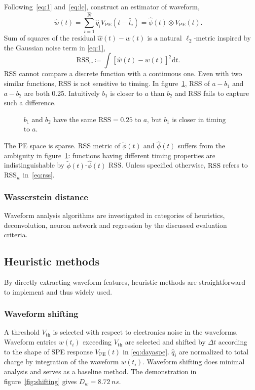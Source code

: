 Following~\eqref{eq:1} and~\eqref{eq:lc}, construct an estimator of waveform,
\begin{equation}
  \label{eq:w-hat}
  \hat{w}(t) = \sum_{i=1}^{\hat{N}}\hat{q}_i V_\mathrm{PE}(t-\hat{t}_i) = \hat{\phi}(t) \otimes V_\mathrm{PE}(t).
\end{equation}
Sum of squares of the residual $\hat{w}(t) - w(t)$ is a natural $\ell_2$-metric inspired by the Gaussian noise term in \eqref{eq:1},
\begin{equation}
  \label{eq:rss}
  \mathrm{RSS}_w\coloneqq\int\left[\hat{w}(t) - w(t)\right]^2\mathrm{d}t.
\end{equation}
RSS cannot compare a discrete function with a continuous one.  Even with two similar functions, RSS is not sensitive to timing.  In figure~\ref{fig:l2}, RSS of  $a-b_{1}$ and $a-b_{2}$ are both 0.25.  Intuitively $b_1$ is closer to $a$ than $b_2$ and RSS fails to capture such a difference.
\begin{figure}[H]
  \centering
  \scalebox{0.4}{}
  \caption{\label{fig:l2} $b_1$ and $b_2$ have the same $\mathrm{RSS}=0.25$ to $a$, but $b_1$ is closer in timing to $a$.}
\end{figure}

The PE space is sparse. RSS metric of $\tilde{\phi}(t)$ and $\hat{\phi}(t)$ suffers from the ambiguity in figure~\ref{fig:l2}: functions having different timing properties are indistinguishable by $\tilde{\phi}(t)$-$\hat{\phi}(t)$ RSS.  Unless specified otherwise, $\mathrm{RSS}$ refers to $\mathrm{RSS}_w$ in~\eqref{eq:rss}.

\subsubsection{Wasserstein distance}
\label{sec:W-dist}



Waveform analysis algorithms are investigated in categories of heuristics, deconvolution, neuron network and regression by the discussed evaluation criteria.

\subsection{Heuristic methods}
By directly extracting waveform features, heuristic methods are straightforward to implement and thus widely used. 

\subsubsection{Waveform shifting}
\label{sec:shifting}
A threshold $V_\mathrm{th}$ is selected with respect to electronics noise in the waveforms. Waveform entries $w(t_i)$ exceeding $V_\mathrm{th}$ are selected and shifted by $\Delta t$ according to the shape of SPE response $V_\mathrm{PE}(t)$ in \eqref{eq:dayaspe}. $\hat{q}_i$ are normalized to total charge by integration of the waveform $w(t_i)$.  Waveform shifting does minimal analysis and serves as a baseline method.  The demonstration in figure~\ref{fig:shifting} gives $D_w = \SI{8.72}{ns}$.

